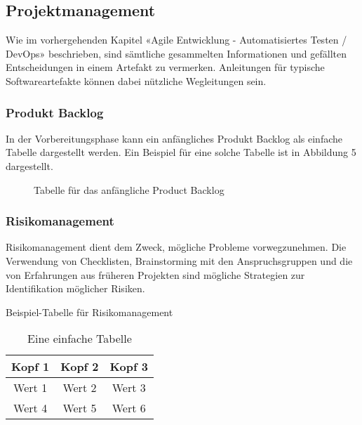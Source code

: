\documentclass[main.tex]{subfiles} %
\begin{document}
\subsection{Projektmanagement}

Wie im vorhergehenden Kapitel «Agile Entwicklung - Automatisiertes Testen / DevOps»
beschrieben, sind sämtliche gesammelten Informationen und gefällten Entscheidungen
in einem Artefakt zu vermerken. Anleitungen für typische Softwareartefakte können
dabei nützliche Wegleitungen sein.

\subsubsection{Produkt Backlog}

In der Vorbereitungsphase kann ein anfängliches Produkt Backlog als einfache Tabelle
dargestellt werden. Ein Beispiel für eine solche Tabelle ist in Abbildung 5 dargestellt.



\begin{figure}[h]
    \centering

    \caption{Tabelle für das anfängliche Product Backlog}
    \label{fig:backlog_table}
\end{figure}


\subsubsection{Risikomanagement}
Risikomanagement dient dem Zweck, mögliche Probleme vorwegzunehmen. Die Verwendung von
Checklisten, Brainstorming mit den Anspruchsgruppen und die von Erfahrungen
aus früheren Projekten sind mögliche Strategien zur Identifikation möglicher Risiken.

\begin{table}[h]
    \centering
    \caption{Beispiel-Tabelle für Risikomanagement}
    \begin{tabular}{|c|c|c|}
        \hline
        Kopf 1 & Kopf 2 & Kopf 3 \\
        \hline
        Wert 1 & Wert 2 & Wert 3 \\
        \hline
        Wert 4 & Wert 5 & Wert 6 \\
        \hline
    \end{tabular}
    \caption{Eine einfache Tabelle}
    \label{tab:meineTabelle}

\end{table}
\end{document}
